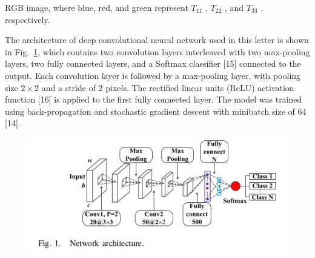 \documentclass[paper=a4, fontsize=11pt]{scrartcl}
\begin{document}
RGB image, where blue, red, and green represent $T_{11}$ , $T_{22}$ , and $T_{33}$ , respectively.

The architecture of deep convolutional neural network used in this letter is shown in Fig.~\ref{Fig:Networkarchitecture}, which contains two convolution layers interleaved with two max-pooling layers, two fully connected layers, and a Softmax classifier [15] connected to the output. 
Each convolution layer is followed by a max-pooling layer, with pooling size $2 \times 2$ and a stride of 2 pixels. 
The rectified linear units (ReLU) activation function [16] is applied to the first fully connected layer.
The model was trained using back-propagation and stochastic gradient descent with minibatch size of 64 [14].

\begin{figure}[hbt]
	\centering
	\includegraphics[width=0.7\linewidth]{Figures/Networkarchitecture.jpg}
	\label{Fig:Networkarchitecture}
\end{figure}
\end{document}

